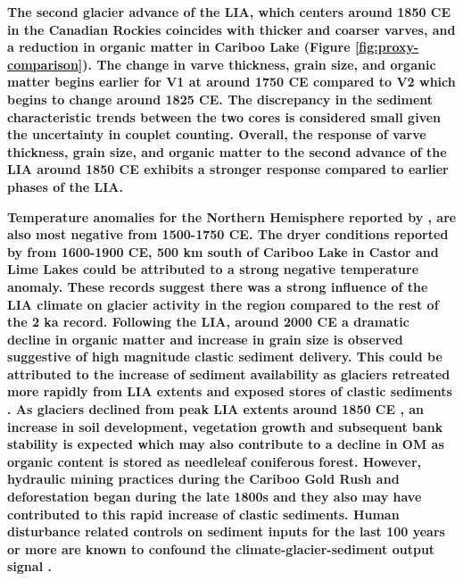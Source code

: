 \documentclass[Royal,times,doublespace,sageh]{sagej}
\begin{document}
\textbf{The second glacier advance of the LIA, which centers around 1850
CE in the Canadian Rockies \citep{Luckman2000g, Leonard1997} coincides
with thicker and coarser varves, and a reduction in organic matter in
Cariboo Lake (Figure \ref{fig:proxy-comparison}). The change in varve
thickness, grain size, and organic matter begins earlier for V1 at
around 1750 CE compared to V2 which begins to change around 1825 CE. The
discrepancy in the sediment characteristic trends between the two cores
is considered small given the uncertainty in couplet counting. Overall,
the response of varve thickness, grain size, and organic matter to the
second advance of the LIA around 1850 CE exhibits a stronger response
compared to earlier phases of the LIA.}

\textbf{Temperature anomalies for the Northern Hemisphere reported by
\citet{Moberg2005}, are also most negative from 1500-1750 CE. The dryer
conditions reported by \citet{Steinman2012} from 1600-1900 CE, 500 km
south of Cariboo Lake in Castor and Lime Lakes could be attributed to a
strong negative temperature anomaly. These records suggest there was a
strong influence of the LIA climate on glacier activity in the region
compared to the rest of the 2 ka record. Following the LIA, around 2000
CE a dramatic decline in organic matter and increase in grain size is
observed suggestive of high magnitude clastic sediment delivery. This
could be attributed to the increase of sediment availability as glaciers
retreated more rapidly from LIA extents and exposed stores of clastic
sediments \citep{Beedle2015}. As glaciers declined from peak LIA extents
around 1850 CE \citep{Leonard1997, Luckman2000g}, an increase in soil
development, vegetation growth and subsequent bank stability is expected
which may also contribute to a decline in OM as organic content is
stored as needleleaf coniferous forest. However, hydraulic mining
practices during the Cariboo Gold Rush and deforestation began during
the late 1800s and they also may have contributed to this rapid increase
of clastic sediments. Human disturbance related controls on sediment
inputs for the last 100 years or more are known to confound the
climate-glacier-sediment output signal \citep{Beedle2015}.}
\end{document}

